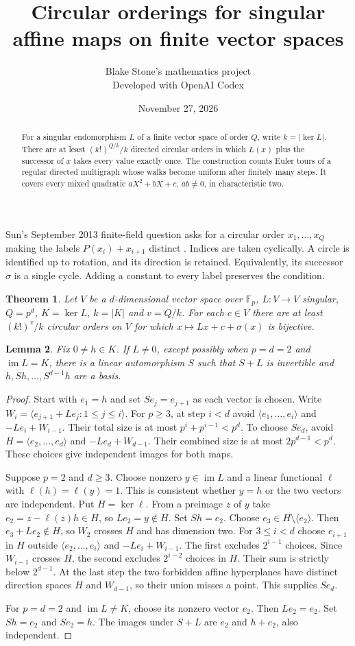 \documentclass[11pt]{article}
\title{Circular orderings for singular affine maps on finite vector spaces}
\author{Blake Stone's mathematics project\\\small Developed with OpenAI Codex}
\date{November 27, 2026}
\newtheorem{theorem}{Theorem}\newtheorem{lemma}[theorem]{Lemma}\newtheorem{corollary}[theorem]{Corollary}
\newcommand{\F}{\mathbb F}
\begin{document}
\maketitle
\begin{abstract}
For a singular endomorphism $L$ of a finite vector space of order $Q$, write $k=|\ker L|$. There are at least $(k!)^{Q/k}/k$ directed circular orders in which $L(x)$ plus the successor of $x$ takes every value exactly once. The construction counts Euler tours of a regular directed multigraph whose walks become uniform after finitely many steps. It covers every mixed quadratic $aX^2+bX+c$, $ab\ne0$, in characteristic two.
\end{abstract}
Sun's September 2013 finite-field question asks for a circular order $x_1,\ldots,x_Q$ making the labels $P(x_i)+x_{i+1}$ distinct \cite{sun}. Indices are taken cyclically. A circle is identified up to rotation, and its direction is retained. Equivalently, its successor $\sigma$ is a single cycle. Adding a constant to every label preserves the condition.
\begin{theorem}\label{main}
Let $V$ be a $d$-dimensional vector space over $\F_p$, $L:V\to V$ singular, $Q=p^d$, $K=\ker L$, $k=|K|$ and $v=Q/k$. For each $c\in V$ there are at least $(k!)^v/k$ circular orders on $V$ for which $x\mapsto Lx+c+\sigma(x)$ is bijective.
\end{theorem}
\begin{lemma}\label{basis}
Fix $0\ne h\in K$. If $L\ne0$, except possibly when $p=d=2$ and $\operatorname{im}L=K$, there is a linear automorphism $S$ such that $S+L$ is invertible and $h,Sh,\ldots,S^{d-1}h$ are a basis.
\end{lemma}
\begin{proof}
Start with $e_1=h$ and set $Se_j=e_{j+1}$ as each vector is chosen. Write $W_i=\langle e_{j+1}+Le_j:1\le j\le i\rangle$. For $p\ge3$, at step $i<d$ avoid $\langle e_1,\ldots,e_i\rangle$ and $-Le_i+W_{i-1}$. Their total size is at most $p^i+p^{i-1}<p^d$. To choose $Se_d$, avoid $H=\langle e_2,\ldots,e_d\rangle$ and $-Le_d+W_{d-1}$. Their combined size is at most $2p^{d-1}<p^d$. These choices give independent images for both maps.

Suppose $p=2$ and $d\ge3$. Choose nonzero $y\in\operatorname{im}L$ and a linear functional $\ell$ with $\ell(h)=\ell(y)=1$. This is consistent whether $y=h$ or the two vectors are independent. Put $H=\ker\ell$. From a preimage $z$ of $y$ take $e_2=z-\ell(z)h\in H$, so $Le_2=y\notin H$. Set $Sh=e_2$. Choose $e_3\in H\setminus\langle e_2\rangle$. Then $e_3+Le_2\notin H$, so $W_2$ crosses $H$ and has dimension two. For $3\le i<d$ choose $e_{i+1}$ in $H$ outside $\langle e_2,\ldots,e_i\rangle$ and $-Le_i+W_{i-1}$. The first excludes $2^{i-1}$ choices. Since $W_{i-1}$ crosses $H$, the second excludes $2^{i-2}$ choices in $H$. Their sum is strictly below $2^{d-1}$. At the last step the two forbidden affine hyperplanes have distinct direction spaces $H$ and $W_{d-1}$, so their union misses a point. This supplies $Se_d$.

For $p=d=2$ and $\operatorname{im}L\ne K$, choose its nonzero vector $e_2$. Then $Le_2=e_2$. Set $Sh=e_2$ and $Se_2=h$. The images under $S+L$ are $e_2$ and $h+e_2$, also independent.
\end{proof}
\end{document}
